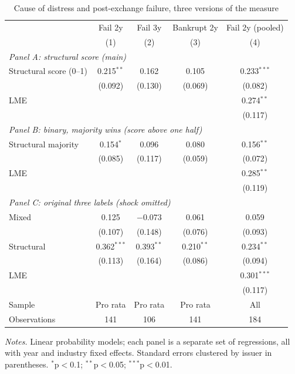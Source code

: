 \begin{table}[H]
\centering
\caption{Cause of distress and post-exchange failure, three versions of the measure}
\label{tab:reg_part1}
\small
\begin{tabular}{l c c c c}
\toprule
 & Fail 2y & Fail 3y & Bankrupt 2y & Fail 2y (pooled) \\
 & (1) & (2) & (3) & (4) \\
\midrule
\multicolumn{5}{l}{\textit{Panel A: structural score (main)}} \\
\quad Structural score (0--1) & 0.215$^{**}$ & 0.162 & 0.105 & 0.233$^{***}$ \\
 & (0.092) & (0.130) & (0.069) & (0.082) \\
\quad LME &  &  &  & 0.274$^{**}$ \\
 &  &  &  & (0.117) \\
\multicolumn{5}{l}{\textit{Panel B: binary, majority wins (score above one half)}} \\
\quad Structural majority & 0.154$^{*}$ & 0.096 & 0.080 & 0.156$^{**}$ \\
 & (0.085) & (0.117) & (0.059) & (0.072) \\
\quad LME &  &  &  & 0.285$^{**}$ \\
 &  &  &  & (0.119) \\
\multicolumn{5}{l}{\textit{Panel C: original three labels (shock omitted)}} \\
\quad Mixed & 0.125 & $-0.073$ & 0.061 & 0.059 \\
 & (0.107) & (0.148) & (0.076) & (0.093) \\
\quad Structural & 0.362$^{***}$ & 0.393$^{**}$ & 0.210$^{**}$ & 0.234$^{**}$ \\
 & (0.113) & (0.164) & (0.086) & (0.094) \\
\quad LME &  &  &  & 0.301$^{***}$ \\
 &  &  &  & (0.117) \\
\midrule
Sample & Pro rata & Pro rata & Pro rata & All \\
Observations & 141 & 106 & 141 & 184 \\
\bottomrule
\end{tabular}
\begin{minipage}{0.95\textwidth}\vspace{4pt}\footnotesize
\textit{Notes.} Linear probability models; each panel is a separate set of regressions, all with year and industry fixed effects. Standard errors clustered by issuer in parentheses. $^{*}$p$<$0.1; $^{**}$p$<$0.05; $^{***}$p$<$0.01.
\end{minipage}
\end{table}

